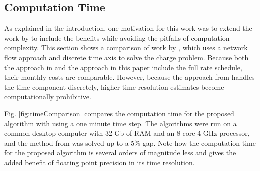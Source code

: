 \subsection{Computation Time\label{sec:results:time}} 
As explained in the introduction, one motivation for this work was to extend the work by \cite{mortensen_comprehensive_2021} to include the benefits while avoiding the pitfalls of computation complexity. This section shows a comparison of work by \cite{mortensen_comprehensive_2021}, which uses a network flow approach and discrete time axis to solve the charge problem. Because both the approach in \cite{mortensen_comprehensive_2021} and the approach in this paper include the full rate schedule, their monthly costs are comparable. However, because the approach from \cite{mortensen_comprehensive_2021} handles the time component discretely, higher time resolution estimates become computationally prohibitive. 
\par Fig. \ref{fig:timeComparison} compares the computation time for the proposed algorithm with \cite{mortensen_comprehensive_2021} using a one minute time step. The algorithms were run on a common desktop computer with 32 Gb of RAM and an 8 core 4 GHz processor, and the method from \cite{mortensen_comprehensive_2021} was solved up to a 5\% gap. Note how the computation time for the proposed algorithm is several orders of magnitude less and gives the added benefit of floating point precision in its time resolution.


